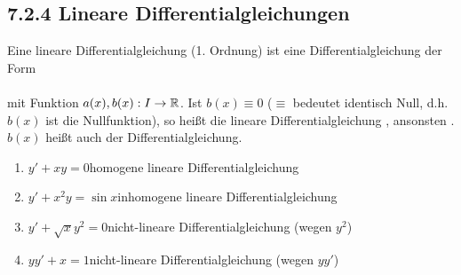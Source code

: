 \subsection{7.2.4 Lineare Differentialgleichungen}
\Def Eine lineare Differentialgleichung (1. Ordnung) ist eine Differentialgleichung der Form\\
\\
mit Funktion $a(x),b(x):I\to\mathbb{R}$. Ist $b(x)\equiv0$ ({\flqq$\equiv$\frqq} bedeutet {\flqq identisch Null\frqq}, d.h. $b(x)$ ist die Nullfunktion), so heißt die lineare Differentialgleichung , ansonsten .\\
$b(x)$ heißt auch  der Differentialgleichung.

\Bsp\quad
\begin{enumerate}
	\item $y'+xy=0$\qquad homogene lineare Differentialgleichung
	\item $y'+x^2y=\sin x$\qquad inhomogene lineare Differentialgleichung
	\item $y'+\sqrt{x}y^2=0$\qquad nicht-lineare Differentialgleichung (wegen $y^2$)
	\item $yy'+x=1$\qquad nicht-lineare Differentialgleichung (wegen $yy'$)
\end{enumerate}


